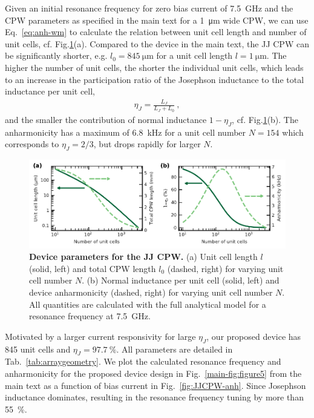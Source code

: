 Given an initial resonance frequency for zero bias current of \SI{7.5}{\giga\hertz} and the CPW parameters as specified in the main text for a \SI{1}{\micro\meter} wide CPW, we can use Eq.~\eqref{eq:anh-wm} to calculate the relation between unit cell length and number of unit cells, cf. Fig.\ref{fig:JJCPW}(a).
% 
Compared to the device in the main text, the JJ CPW can be significantly shorter, e.g. $l_0=\SI{845}{\micro\meter}$ for a unit cell length $l=\SI{1}{\micro\meter}$.
% 
The higher the number of unit cells, the shorter the individual unit cells, which leads to an increase in the participation ratio of the Josephson inductance to the total inductance per unit cell, 
% 
\begin{align}
\eta_J = \frac{L_J}{L_J+L_0} \ ,
\end{align}
% 
and the smaller the contribution of normal inductance $1-\eta_J$, cf. Fig.\ref{fig:JJCPW}(b).
% 
The anharmonicity has a maximum of \SI{6.8}{\kilo\hertz} for a unit cell number $N=154$ which corresponds to $\eta_J=2/3$, but drops rapidly for larger $N$.

\begin{figure}
	\centering
	\includegraphics[width=\linewidth]{chapter-currentdetection/figures/SM_JJarrayCPW_vs_N}
	\caption{
		\textbf{Device parameters for the JJ CPW.}
		(a) Unit cell length $l$ (solid, left) and total CPW length $l_0$ (dashed, right) for varying unit cell number $N$.
		(b) Normal inductance per unit cell (solid, left) and device anharmonicity (dashed, right) for varying unit cell number $N$.
		All quantities are calculated with the full analytical model for a resonance frequency at \SI{7.5}{\giga\hertz}.
	}
	\label{fig:JJCPW}
\end{figure}

Motivated by a larger current responsivity for large $\eta_J$, our proposed device has 845 unit cells and $\eta_J=\SI{97.7}{\percent}$.
% 
All parameters are detailed in Tab.~\ref{tab:arraygeometry}.
% 
We plot the calculated resonance frequency and anharmonicity for the proposed device design in Fig.~\ref{main-fig:figure5} from the main text as a function of bias current in Fig.~\ref{fig:JJCPW-anh}.
% 
Since Josephson inductance dominates, resulting in the resonance frequency tuning by more than \SI{55}{\percent}.

